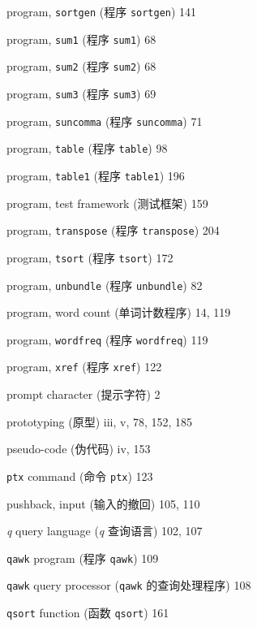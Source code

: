 \begin{multicols}{2}
\hangindent=2pc  program, \verb'sortgen'  (程序 \verb'sortgen') 141

\hangindent=2pc  program, \verb'sum1'  (程序 \verb'sum1') 68

\hangindent=2pc  program, \verb'sum2'  (程序 \verb'sum2') 68

\hangindent=2pc  program, \verb'sum3'  (程序 \verb'sum3') 69

\hangindent=2pc  program, \verb'suncomma' (程序 \verb'suncomma') 71

\hangindent=2pc  program, \verb'table' (程序 \verb'table') 98

\hangindent=2pc  program, \verb'table1' (程序 \verb'table1') 196

\hangindent=2pc  program, test framework (测试框架) 159

\hangindent=2pc  program, \verb'transpose' (程序
\verb'transpose') 204

\hangindent=2pc  program, \verb'tsort' (程序 \verb'tsort') 172

\hangindent=2pc  program, \verb'unbundle' (程序
\verb'unbundle') 82

\hangindent=2pc  program, word count (单词计数程序) 14, 119

\hangindent=2pc  program, \verb'wordfreq' (程序
\verb'wordfreq') 119

\hangindent=2pc  program, \verb'xref' (程序 \verb'xref') 122

\hangindent=2pc  prompt character (提示字符) 2

\hangindent=2pc  prototyping (原型) iii, v, 78, 152, 185

\hangindent=2pc  pseudo-code (伪代码) iv, 153

\hangindent=2pc  \verb'ptx' command (命令 \verb'ptx') 123

\hangindent=2pc  pushback, input (输入的撤回) 105, 110

\hangindent=2pc  \textit{q} query language (\textit{q}
查询语言) 102, 107

\hangindent=2pc  \verb'qawk' program (程序 \verb'qawk') 109

\hangindent=2pc  \verb'qawk' query processor (\verb'qawk'
的查询处理程序) 108

\hangindent=2pc  \verb'qsort' function (函数 \verb'qsort') 161


\end{multicols}
